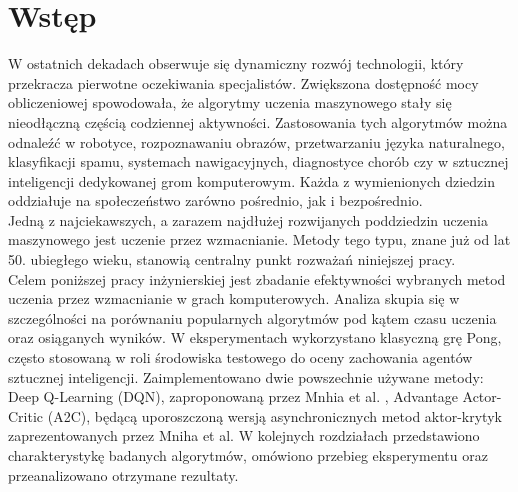 \documentclass[a4paper, 12pt]{article}
\numberwithin{equation}{section}
\begin{document}
    \section{Wstęp}
    W ostatnich dekadach obserwuje się dynamiczny rozwój technologii, który przekracza pierwotne oczekiwania specjalistów.
    Zwiększona dostępność mocy obliczeniowej spowodowała, że algorytmy uczenia maszynowego stały się nieodłączną częścią codziennej aktywności.
    Zastosowania tych algorytmów można odnaleźć w robotyce, rozpoznawaniu obrazów, przetwarzaniu języka naturalnego, klasyfikacji spamu, systemach nawigacyjnych, diagnostyce chorób czy w sztucznej inteligencji dedykowanej grom komputerowym. 
    Każda z wymienionych dziedzin oddziałuje na społeczeństwo zarówno pośrednio, jak i bezpośrednio.
    \\
    \indent Jedną z najciekawszych, a zarazem najdłużej rozwijanych poddziedzin uczenia maszynowego jest uczenie przez wzmacnianie. 
    Metody tego typu, znane już od lat 50. ubiegłego wieku, stanowią centralny punkt rozważań niniejszej pracy.
    \\
    \indent Celem poniższej pracy inżynierskiej jest zbadanie efektywności wybranych metod uczenia przez wzmacnianie w grach komputerowych. 
    Analiza skupia się w szczególności na porównaniu popularnych algorytmów pod kątem czasu uczenia oraz osiąganych wyników.
    W eksperymentach wykorzystano klasyczną grę Pong, często stosowaną w roli środowiska testowego do oceny zachowania agentów sztucznej inteligencji. 
    Zaimplementowano dwie powszechnie używane metody: Deep Q-Learning (DQN), zaproponowaną przez Mnhia et al. \cite{mnih2015dqn}, Advantage Actor-Critic (A2C),
    będącą uporoszczoną wersją asynchronicznych metod aktor-krytyk zaprezentowanych przez Mniha et al. \cite{mnih2016a3c} 
    W kolejnych rozdziałach przedstawiono charakterystykę badanych algorytmów, omówiono przebieg eksperymentu oraz przeanalizowano otrzymane rezultaty.
\end{document}
